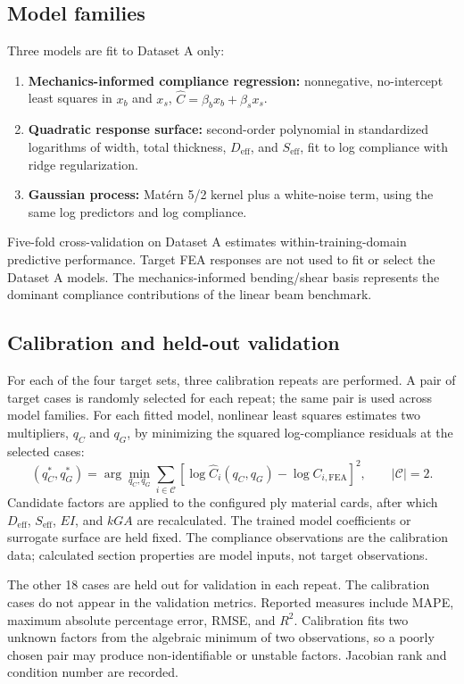 \documentclass[11pt]{article}
\newcommand{\Dref}{D_{\mathrm{eff}}}
\newcommand{\Sref}{S_{\mathrm{eff}}}
\begin{document}
\subsection{Model families}
Three models are fit to Dataset A only:
\begin{enumerate}
\item \textbf{Mechanics-informed compliance regression:} nonnegative, no-intercept least squares in $x_b$ and $x_s$, $\widehat C=\beta_bx_b+\beta_sx_s$.
\item \textbf{Quadratic response surface:} second-order polynomial in standardized logarithms of width, total thickness, $\Dref$, and $\Sref$, fit to log compliance with ridge regularization.
\item \textbf{Gaussian process:} Mat\'ern 5/2 kernel plus a white-noise term, using the same log predictors and log compliance.
\end{enumerate}
Five-fold cross-validation on Dataset A estimates within-training-domain predictive performance. Target FEA responses are not used to fit or select the Dataset A models. The mechanics-informed bending/shear basis represents the dominant compliance contributions of the linear beam benchmark.

\subsection{Calibration and held-out validation}
For each of the four target sets, three calibration repeats are performed. A pair of target cases is randomly selected for each repeat; the same pair is used across model families. For each fitted model, nonlinear least squares estimates two multipliers, $q_C$ and $q_G$, by minimizing the squared log-compliance residuals at the selected cases:
\begin{equation}
 (q_C^*,q_G^*)=\arg\min_{q_C,q_G}\sum_{i\in\mathcal C}
 \left[\log\widehat C_i(q_C,q_G)-\log C_{i,\mathrm{FEA}}\right]^2,
 \qquad |\mathcal C|=2.
\end{equation}
Candidate factors are applied to the configured ply material cards, after which $\Dref$, $\Sref$, $EI$, and $kGA$ are recalculated. The trained model coefficients or surrogate surface are held fixed. The compliance observations are the calibration data; calculated section properties are model inputs, not target observations.

The other 18 cases are held out for validation in each repeat. The calibration cases do not appear in the validation metrics. Reported measures include MAPE, maximum absolute percentage error, RMSE, and $R^2$. Calibration fits two unknown factors from the algebraic minimum of two observations, so a poorly chosen pair may produce non-identifiable or unstable factors. Jacobian rank and condition number are recorded.
\end{document}
